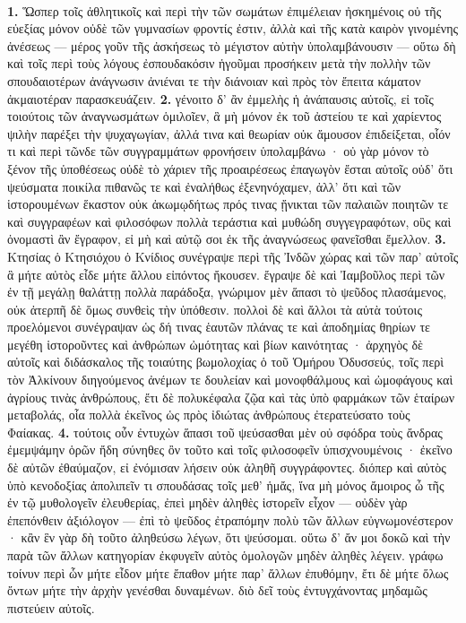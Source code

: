 \documentclass[a4paper, 11pt, oneside, polutonikogreek, german]{article}
\begin{document}
\paragraph{}
\textbf{1.} Ὥσπερ τοῖς ἀθλητικοῖς καὶ περὶ τὴν τῶν σωμάτων ἐπιμέλειαν ἠσκημένοις οὐ τῆς εὐεξίας μόνον οὐδὲ τῶν γυμνασίων φροντίς ἐστιν, ἀλλὰ καὶ τῆς κατὰ καιρὸν γινομένης ἀνέσεως --- μέρος γοῦν τῆς ἀσκήσεως τὸ μέγιστον αὐτὴν ὑπολαμβάνουσιν --- οὕτω δὴ καὶ τοῖς περὶ τοὺς λόγους ἐσπουδακόσιν ἡγοῦμαι προσήκειν μετὰ τὴν πολλὴν τῶν σπουδαιοτέρων ἀνάγνωσιν ἀνιέναι τε τὴν διάνοιαν καὶ πρὸς τὸν ἔπειτα κάματον ἀκμαιοτέραν παρασκευάζειν. \textbf{2.} γένοιτο δ' ἂν ἐμμελὴς ἡ ἀνάπαυσις αὐτοῖς, εἰ τοῖς τοιούτοις τῶν ἀναγνωσμάτων ὁμιλοῖεν, ἃ μὴ μόνον ἐκ τοῦ ἀστείου τε καὶ χαρίεντος ψιλὴν παρέξει τὴν ψυχαγωγίαν, ἀλλά τινα καὶ θεωρίαν οὐκ ἄμουσον ἐπιδείξεται, οἷόν τι καὶ περὶ τῶνδε τῶν συγγραμμάτων φρονήσειν ὑπολαμβάνω · οὐ γὰρ μόνον τὸ ξένον τῆς ὑποθέσεως οὐδὲ τὸ χάριεν τῆς προαιρέσεως ἐπαγωγὸν ἔσται αὐτοῖς οὐδ' ὅτι ψεύσματα ποικίλα πιθανῶς τε καὶ ἐναλήθως ἐξενηνόχαμεν, ἀλλ' ὅτι καὶ τῶν ἱστορουμένων ἕκαστον οὐκ ἀκωμῳδήτως πρός τινας ᾔνικται τῶν παλαιῶν ποιητῶν τε καὶ συγγραφέων καὶ φιλοσόφων πολλὰ τεράστια καὶ μυθώδη συγγεγραφότων, οὓς καὶ ὀνομαστὶ ἂν ἔγραφον, εἰ μὴ καὶ αὐτῷ σοι ἐκ τῆς ἀναγνώσεως φανεῖσθαι ἔμελλον. \textbf{3.} Κτησίας ὁ Κτησιόχου ὁ Κνίδιος συνέγραψε περὶ τῆς Ἰνδῶν χώρας καὶ τῶν παρ' αὐτοῖς ἃ μήτε αὐτὸς εἶδε μήτε ἄλλου εἰπόντος ἤκουσεν. ἔγραψε δὲ καὶ Ἰαμβοῦλος περὶ τῶν ἐν τῇ μεγάλῃ θαλάττῃ πολλὰ παράδοξα, γνώριμον μὲν ἅπασι τὸ ψεῦδος πλασάμενος, οὐκ ἀτερπῆ δὲ ὅμως συνθεὶς τὴν ὑπόθεσιν. πολλοὶ δὲ καὶ ἄλλοι τὰ αὐτὰ τούτοις προελόμενοι συνέγραψαν ὡς δή τινας ἑαυτῶν πλάνας τε καὶ ἀποδημίας θηρίων τε μεγέθη ἱστοροῦντες καὶ ἀνθρώπων ὠμότητας καὶ βίων καινότητας · ἀρχηγὸς δὲ αὐτοῖς καὶ διδάσκαλος τῆς τοιαύτης βωμολοχίας ὁ τοῦ Ὁμήρου Ὀδυσσεύς, τοῖς περὶ τὸν Ἀλκίνουν διηγούμενος ἀνέμων τε δουλείαν καὶ μονοφθάλμους καὶ ὠμοφάγους καὶ ἀγρίους τινὰς ἀνθρώπους, ἔτι δὲ πολυκέφαλα ζῷα καὶ τὰς ὑπὸ φαρμάκων τῶν ἑταίρων μεταβολάς, οἷα πολλὰ ἐκεῖνος ὡς πρὸς ἰδιώτας ἀνθρώπους ἐτερατεύσατο τοὺς Φαίακας. \textbf{4.} τούτοις οὖν ἐντυχὼν ἅπασι τοῦ ψεύσασθαι μὲν οὐ σφόδρα τοὺς ἄνδρας ἐμεμψάμην ὁρῶν ἤδη σύνηθες ὂν τοῦτο καὶ τοῖς φιλοσοφεῖν ὑπισχνουμένοις · ἐκεῖνο δὲ αὐτῶν ἐθαύμαζον, εἰ ἐνόμισαν λήσειν οὐκ ἀληθῆ συγγράφοντες. διόπερ καὶ αὐτὸς ὑπὸ κενοδοξίας ἀπολιπεῖν τι σπουδάσας τοῖς μεθ' ἡμἄς, ἵνα μὴ μόνος ἄμοιρος ὦ τῆς ἐν τῷ μυθολογεῖν ἐλευθερίας, ἐπεὶ μηδὲν ἀληθὲς ἱστορεῖν εἶχον --- οὐδὲν γὰρ ἐπεπόνθειν ἀξιόλογον --- ἐπὶ τὸ ψεῦδος ἐτραπόμην πολὺ τῶν ἄλλων εὐγνωμονέστερον · κἂν ἓν γὰρ δὴ τοῦτο ἀληθεύσω λέγων, ὅτι ψεύσομαι. οὕτω δ' ἄν μοι δοκῶ καὶ τὴν παρὰ τῶν ἄλλων κατηγορίαν ἐκφυγεῖν αὐτὸς ὁμολογῶν μηδὲν ἀληθὲς λέγειν. γράφω τοίνυν περὶ ὧν μήτε εἶδον μήτε ἔπαθον μήτε παρ' ἄλλων ἐπυθόμην, ἔτι δὲ μήτε ὅλως ὄντων μήτε τὴν ἀρχὴν γενέσθαι δυναμένων. διὸ δεῖ τοὺς ἐντυγχάνοντας μηδαμῶς πιστεύειν αὐτοῖς.
\end{document}
